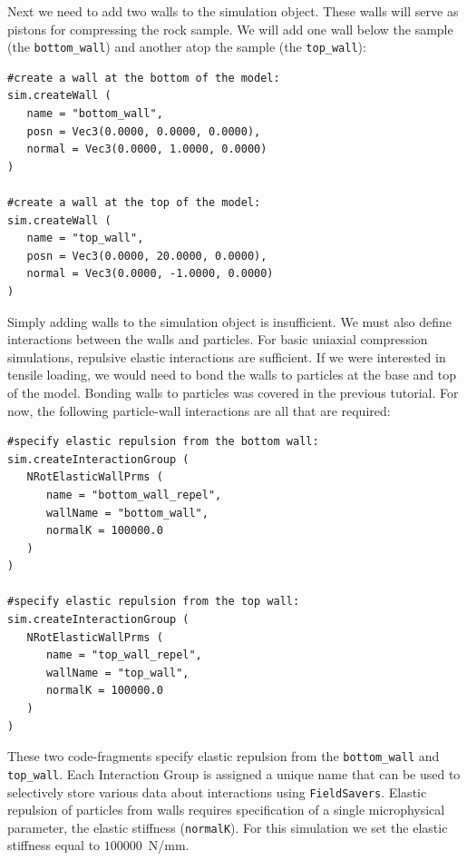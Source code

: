 Next we need to add two walls to the simulation object. These walls will serve as pistons for compressing the rock sample. We will add one wall below the sample (the \texttt{bottom\_wall}) and another atop the sample (the \texttt{top\_wall}):

\begin{verbatim}
#create a wall at the bottom of the model:
sim.createWall (
   name = "bottom_wall",
   posn = Vec3(0.0000, 0.0000, 0.0000),
   normal = Vec3(0.0000, 1.0000, 0.0000)
)

#create a wall at the top of the model:
sim.createWall (
   name = "top_wall",
   posn = Vec3(0.0000, 20.0000, 0.0000),
   normal = Vec3(0.0000, -1.0000, 0.0000)
)
\end{verbatim}

\noindent
Simply adding walls to the simulation object is insufficient. We must also define interactions between the walls and particles. For basic uniaxial compression simulations, repulsive elastic interactions are sufficient. If we were interested in tensile loading, we would need to bond the walls to particles at the base and top of the model. Bonding walls to particles was covered in the previous tutorial. For now, the following particle-wall interactions are all that are required:

\begin{verbatim} 
#specify elastic repulsion from the bottom wall:
sim.createInteractionGroup (
   NRotElasticWallPrms (
      name = "bottom_wall_repel",
      wallName = "bottom_wall",
      normalK = 100000.0
   )
)

#specify elastic repulsion from the top wall:
sim.createInteractionGroup (
   NRotElasticWallPrms (
      name = "top_wall_repel",
      wallName = "top_wall",
      normalK = 100000.0
   )
)
\end{verbatim} 

\noindent
These two code-fragments specify elastic repulsion from the \texttt{bottom\_wall} and \texttt{top\_wall}. Each Interaction Group is assigned a unique name that can be used to selectively store various data about interactions using \texttt{FieldSavers}. Elastic repulsion of particles from walls requires specification of a single microphysical parameter, the elastic stiffness (\texttt{normalK}). For this simulation we set the elastic stiffness equal to $100000$~N/mm.


